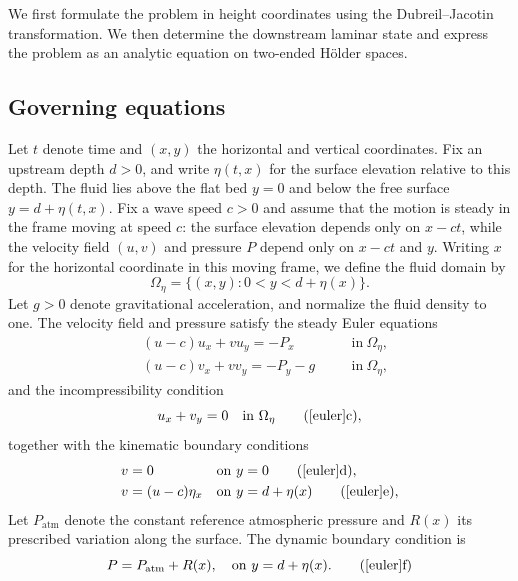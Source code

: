 \documentclass[12pt,letterpaper]{amsart}
\numberwithin{equation}{section}
\begin{document}
{We first formulate the problem in height coordinates using the Dubreil--Jacotin transformation. We then determine the downstream laminar state and express the problem as an analytic equation on two-ended H\"older spaces.}
\subsection{Governing equations} {Let $t$ denote time and $(x,y)$ the horizontal and vertical coordinates. Fix an upstream depth $d>0$, and write $\eta(t,x)$ for the surface elevation relative to this depth. The fluid lies above the flat bed $y=0$ and below the free surface $y=d+\eta(t,x)$. Fix a wave speed $c>0$ and assume that the motion is steady in the frame moving at speed $c$: the surface elevation depends only on $x-ct$, while the velocity field $(u,v)$ and pressure $P$ depend only on $x-ct$ and $y$. Writing $x$ for the horizontal coordinate in this moving frame, we define the fluid domain by}
\begin{equation*}
	\Omega_\eta=\{(x,y):0<y<d+\eta(x)\}.
\end{equation*}
{Let $g>0$ denote gravitational acceleration, and normalize the fluid density to one. The velocity field and pressure satisfy the steady Euler equations}
\begin{subequations}\label{euler}
	\begin{align}
	&(u-c)u_x+vu_y=-P_x\quad&&\mathrm{in~}\Omega_\eta,\label{euler1}\\
	&(u-c)v_x+vv_y=-P_y-g\quad&&\mathrm{in~}\Omega_\eta\label{euler2},
	\end{align}
\end{subequations}
{and the incompressibility condition}
\begin{equation}
	u_x+v_y=0\quad\mathrm{in~}\Omega_\eta\tag{\ref{euler}{c}}\label{euler3},
\end{equation}
	{together with the kinematic boundary conditions}
	\begin{subequations}
		\begin{align}
		&v=0\quad&&\mathrm{on~}y=0\tag{\ref{euler}{d}}\label{euler4},\\
	&v=(u-c)\eta_x&&\mathrm{on~}y=d+\eta(x)\tag{\ref{euler}{e}}\label{euler5},
	\end{align}
	\end{subequations}
	{Let $P_{\mathrm{atm}}$ denote the constant reference atmospheric pressure and $R(x)$ its prescribed variation along the surface. The dynamic boundary condition is}
	\begin{equation}
		P=P_{\mathrm{atm}}+R(x),\quad\mathrm{on~}y=d+\eta(x).\tag{\ref{euler}{f}}\label{euler6}
	\end{equation}
\end{document}
